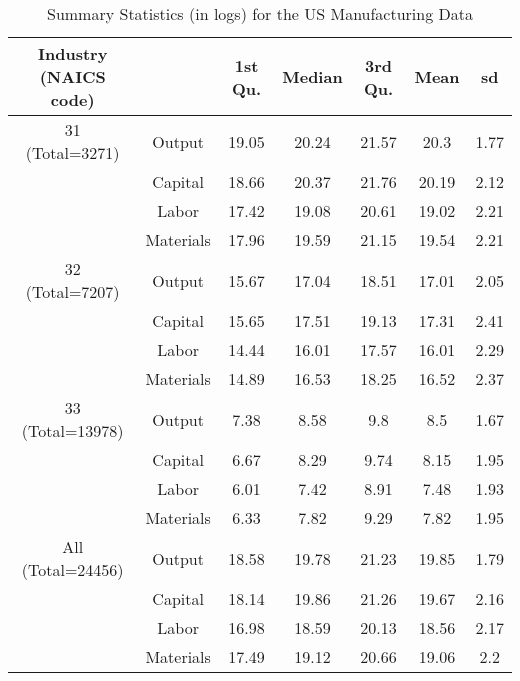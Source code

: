 \begin{table}[H]
\centering
\caption{Summary Statistics (in logs) for the US Manufacturing Data} 
\begin{tabular}{ccccccc}
  \hline\hline Industry (NAICS code) &   & 1st Qu. & Median & 3rd Qu. & Mean & sd \\ 
  \hline
31 (Total=3271) & Output & 19.05 & 20.24 & 21.57 & 20.3 & 1.77 \\ 
   & Capital & 18.66 & 20.37 & 21.76 & 20.19 & 2.12 \\ 
   & Labor & 17.42 & 19.08 & 20.61 & 19.02 & 2.21 \\ 
   & Materials & 17.96 & 19.59 & 21.15 & 19.54 & 2.21 \\ 
  32 (Total=7207) & Output & 15.67 & 17.04 & 18.51 & 17.01 & 2.05 \\ 
   & Capital & 15.65 & 17.51 & 19.13 & 17.31 & 2.41 \\ 
   & Labor & 14.44 & 16.01 & 17.57 & 16.01 & 2.29 \\ 
   & Materials & 14.89 & 16.53 & 18.25 & 16.52 & 2.37 \\ 
  33 (Total=13978) & Output & 7.38 & 8.58 & 9.8 & 8.5 & 1.67 \\ 
   & Capital & 6.67 & 8.29 & 9.74 & 8.15 & 1.95 \\ 
   & Labor & 6.01 & 7.42 & 8.91 & 7.48 & 1.93 \\ 
   & Materials & 6.33 & 7.82 & 9.29 & 7.82 & 1.95 \\ 
  All (Total=24456) & Output & 18.58 & 19.78 & 21.23 & 19.85 & 1.79 \\ 
   & Capital & 18.14 & 19.86 & 21.26 & 19.67 & 2.16 \\ 
   & Labor & 16.98 & 18.59 & 20.13 & 18.56 & 2.17 \\ 
   & Materials & 17.49 & 19.12 & 20.66 & 19.06 & 2.2 \\ 
   \hline
\end{tabular}
\end{table}
